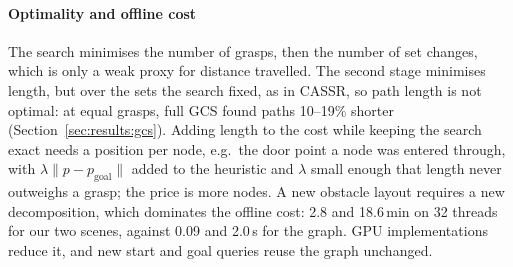 \paragraph{Optimality and offline cost}
The search minimises the number of grasps, then the number of set changes,
which is only a weak proxy for distance travelled. The second stage minimises
length, but over the sets the search fixed, as in CASSR, so path length is not
optimal: at equal grasps, full GCS found paths 10--19\% shorter
(Section~\ref{sec:results:gcs}). Adding length to the cost while keeping the
search exact needs a position per node, e.g.\ the door point a node was
entered through, with $\lambda\|p-p_{\mathrm{goal}}\|$ added to the heuristic
and $\lambda$ small enough that length never outweighs a grasp; the price is
more nodes. A new obstacle layout requires a new decomposition, which
dominates the offline cost: 2.8 and 18.6\,min on 32 threads for our two
scenes, against 0.09 and 2.0\,s for the graph. GPU
implementations~\cite{werner2025superfast} reduce it, and new start and goal
queries reuse the graph unchanged.
